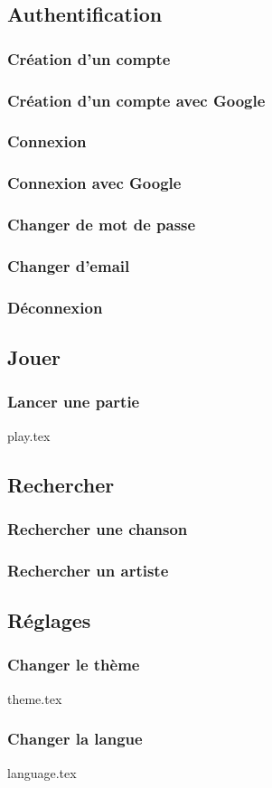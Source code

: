 \subsection{Authentification}
\subsubsection{Création d'un compte}
\subsubsection{Création d'un compte avec Google}
\subsubsection{Connexion}
\subsubsection{Connexion avec Google}
\subsubsection{Changer de mot de passe}
\subsubsection{Changer d'email}
\subsubsection{Déconnexion}

\subsection{Jouer}
\subsubsection{Lancer une partie}
{play.tex}

\subsection{Rechercher}
\subsubsection{Rechercher une chanson}
\subsubsection{Rechercher un artiste}

\subsection{Réglages}
\subsubsection{Changer le thème}
{theme.tex}

\subsubsection{Changer la langue}
{language.tex}